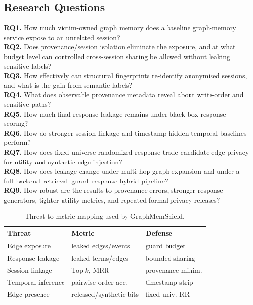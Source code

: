 \documentclass[journal,10pt,twocolumn]{IEEEtran}
\begin{document}
\subsection{Research Questions}
\textbf{RQ1.} How much victim-owned graph memory does a baseline
graph-memory service expose to an unrelated session?\\
\textbf{RQ2.} Does provenance/session isolation eliminate the
exposure, and at what budget level can controlled cross-session
sharing be allowed without leaking sensitive labels?\\
\textbf{RQ3.} How effectively can structural fingerprints
re-identify anonymised sessions, and what is the gain from semantic
labels?\\
\textbf{RQ4.} What does observable provenance metadata reveal about
write-order and sensitive paths?\\
\textbf{RQ5.} How much final-response leakage remains under black-box
response scoring?\\
\textbf{RQ6.} How do stronger session-linkage and timestamp-hidden
temporal baselines perform?\\
\textbf{RQ7.} How does fixed-universe randomized response trade
candidate-edge privacy for utility and synthetic edge injection?\\
\textbf{RQ8.} How does leakage change under multi-hop graph expansion
and under a full backend--retrieval--guard--response hybrid pipeline?\\
\textbf{RQ9.} How robust are the results to provenance errors,
stronger response generators, tighter utility metrics, and repeated
formal privacy releases?

\begin{table}[t]
    \caption{Threat-to-metric mapping used by GraphMemShield.}
    \label{tab:threat-metric}
    \centering
    \small
    \begin{tabular}{lll}
        \toprule
        \textbf{Threat} & \textbf{Metric} & \textbf{Defense} \\
        \midrule
        Edge exposure & leaked edges/events & guard budget \\
        Response leakage & leaked terms/edges & bounded sharing \\
        Session linkage & Top-$k$, MRR & provenance minim. \\
        Temporal inference & pairwise order acc. & timestamp strip \\
        Edge presence & released/synthetic bits & fixed-univ. RR \\
        \bottomrule
    \end{tabular}
\end{table}
\end{document}
